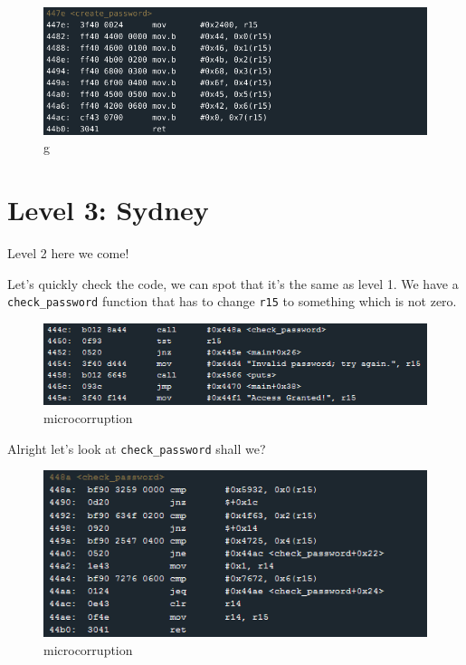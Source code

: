 \documentclass[a4paper,11pt]{article}
\begin{document}
\begin{figure}[htbp]
\centering
\includegraphics{img/1_5.png}
\caption{g}
\end{figure}

\section{Level 3: Sydney}\label{level-3-sydney}

Level 2 here we come!

Let's quickly check the code, we can spot that it's the same as level 1.
We have a \texttt{check\_password} function that has to change
\texttt{r15} to something which is not zero.

\begin{figure}[htbp]
\centering
\includegraphics{img/2_1.PNG}
\caption{microcorruption}
\end{figure}

Alright let's look at \texttt{check\_password} shall we?

\begin{figure}[htbp]
\centering
\includegraphics{img/2_2.PNG}
\caption{microcorruption}
\end{figure}
\end{document}

